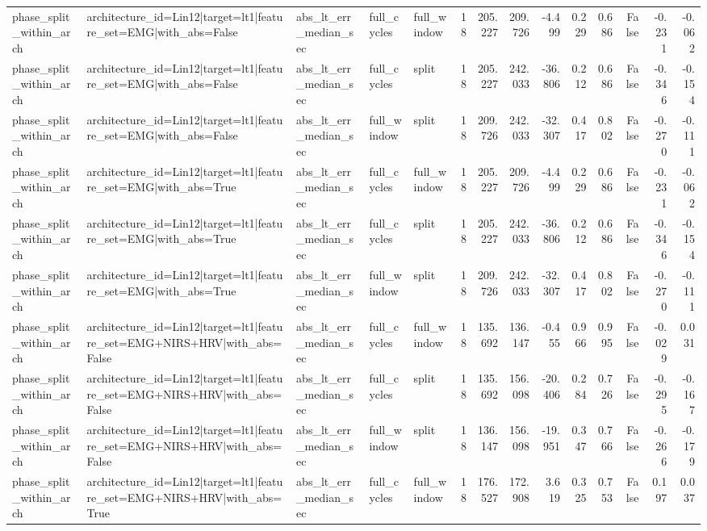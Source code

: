 \begin{table}
\begin{tabular}{lllllrrrrrrrrr}
phase_split_within_arch & architecture_id=Lin12|target=lt1|feature_set=EMG|with_abs=False & abs_lt_err_median_sec & full_cycles & full_window & 18 & 205.227 & 209.726 & -4.499 & 0.229 & 0.686 & False & -0.231 & -0.062 \\
phase_split_within_arch & architecture_id=Lin12|target=lt1|feature_set=EMG|with_abs=False & abs_lt_err_median_sec & full_cycles & split & 18 & 205.227 & 242.033 & -36.806 & 0.212 & 0.686 & False & -0.346 & -0.154 \\
phase_split_within_arch & architecture_id=Lin12|target=lt1|feature_set=EMG|with_abs=False & abs_lt_err_median_sec & full_window & split & 18 & 209.726 & 242.033 & -32.307 & 0.417 & 0.802 & False & -0.270 & -0.111 \\
phase_split_within_arch & architecture_id=Lin12|target=lt1|feature_set=EMG|with_abs=True & abs_lt_err_median_sec & full_cycles & full_window & 18 & 205.227 & 209.726 & -4.499 & 0.229 & 0.686 & False & -0.231 & -0.062 \\
phase_split_within_arch & architecture_id=Lin12|target=lt1|feature_set=EMG|with_abs=True & abs_lt_err_median_sec & full_cycles & split & 18 & 205.227 & 242.033 & -36.806 & 0.212 & 0.686 & False & -0.346 & -0.154 \\
phase_split_within_arch & architecture_id=Lin12|target=lt1|feature_set=EMG|with_abs=True & abs_lt_err_median_sec & full_window & split & 18 & 209.726 & 242.033 & -32.307 & 0.417 & 0.802 & False & -0.270 & -0.111 \\
phase_split_within_arch & architecture_id=Lin12|target=lt1|feature_set=EMG+NIRS+HRV|with_abs=False & abs_lt_err_median_sec & full_cycles & full_window & 18 & 135.692 & 136.147 & -0.455 & 0.966 & 0.995 & False & -0.029 & 0.031 \\
phase_split_within_arch & architecture_id=Lin12|target=lt1|feature_set=EMG+NIRS+HRV|with_abs=False & abs_lt_err_median_sec & full_cycles & split & 18 & 135.692 & 156.098 & -20.406 & 0.284 & 0.726 & False & -0.295 & -0.167 \\
phase_split_within_arch & architecture_id=Lin12|target=lt1|feature_set=EMG+NIRS+HRV|with_abs=False & abs_lt_err_median_sec & full_window & split & 18 & 136.147 & 156.098 & -19.951 & 0.347 & 0.766 & False & -0.266 & -0.179 \\
phase_split_within_arch & architecture_id=Lin12|target=lt1|feature_set=EMG+NIRS+HRV|with_abs=True & abs_lt_err_median_sec & full_cycles & full_window & 18 & 176.527 & 172.908 & 3.619 & 0.325 & 0.753 & False & 0.197 & 0.037 \\

\end{tabular}
\end{table}
